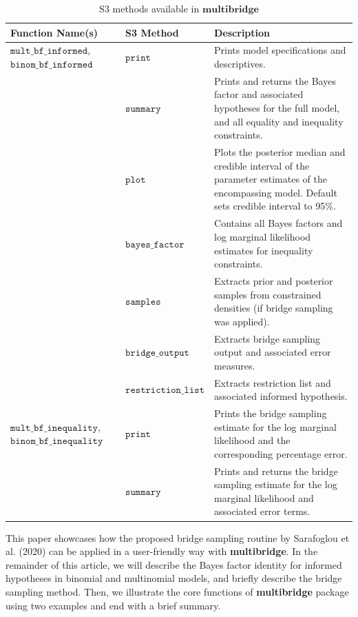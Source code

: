 \documentclass[
  english,
  man,floatsintext]{apa6}
\begin{document}
\begin{table}[H]
\caption {S3 methods available in $\textbf{multibridge}$}
\label{table:s3_methods}
\begin{center}
\begin{tabular}{p{4cm}p{3.5cm}p{9cm}}
        \toprule
Function Name(s) & S3 Method & Description \\\midrule
$\texttt{mult\_bf\_informed}$, $\texttt{binom\_bf\_informed}$ & $\texttt{print}$ & Prints model specifications and descriptives. \\
 & $\texttt{summary}$ &  Prints and returns the Bayes factor and associated hypotheses for the full model, and all equality and inequality constraints.\\
  & $\texttt{plot}$ &  Plots the posterior median and credible interval of the parameter estimates of the encompassing model. Default sets credible interval to 95\%.\\
 & $\texttt{bayes\_factor}$ & Contains all Bayes factors and log marginal likelihood estimates for inequality constraints.\\
 & $\texttt{samples}$ & Extracts prior and posterior samples from constrained densities (if bridge sampling was applied). \\
& $\texttt{bridge\_output}$    &  Extracts bridge sampling output and associated error measures.\\
& $\texttt{restriction\_list}$ & Extracts restriction list and associated informed hypothesis. \\
$\texttt{mult\_bf\_inequality}$, $\texttt{binom\_bf\_inequality}$  & $\texttt{print}$ & Prints the bridge sampling estimate for the log marginal likelihood and the corresponding percentage error. \\
& $\texttt{summary}$ & Prints and returns the bridge sampling estimate for the log marginal likelihood and associated error terms.\\
\bottomrule
\end{tabular}
\end{center}
\end{table}

\noindent This paper showcases how the proposed bridge sampling routine by Sarafoglou et al. (2020) can be applied in a user-friendly way with \textbf{multibridge}. In the remainder of this article, we will describe the Bayes factor identity for informed hypotheses in binomial and multinomial models, and briefly describe the bridge sampling method. Then, we illustrate the core functions of \textbf{multibridge} package using two examples and end with a brief summary.
\end{document}
